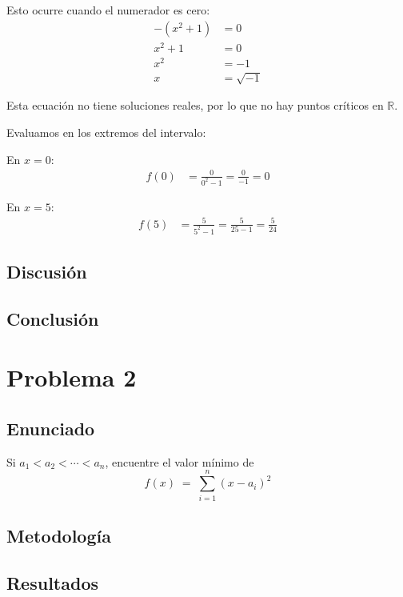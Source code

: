 \documentclass{article}
\begin{document}
Esto ocurre cuando el numerador es cero:
\begin{align}
-(x^{2} + 1) &= 0 \\
x^{2} + 1 &= 0 \\
x^{2} &= -1 \\
x &= \sqrt{-1}
\end{align}

Esta ecuación no tiene soluciones reales, por lo que no hay puntos críticos en $\mathbb{R}$.

Evaluamos en los extremos del intervalo:

En $x = 0$:
\begin{align}
f(0) &= \frac{0}{0^{2} - 1} = \frac{0}{-1} = 0
\end{align}

En $x = 5$:
\begin{align}
f(5) &= \frac{5}{5^{2} - 1} = \frac{5}{25 - 1} = \frac{5}{24}
\end{align}

\subsection{Discusión}


\subsection{Conclusión}


\section{Problema 2}

\subsection{Enunciado}
Si $a_{1} < a_{2} < \cdots < a_{n}$, encuentre el valor mínimo de
\[
f(x) \;=\; \sum_{i=1}^{n} (x - a_i)^2
\]

\subsection{Metodología}

\subsection{Resultados}
\setcounter{equation}{0}
\end{document}
